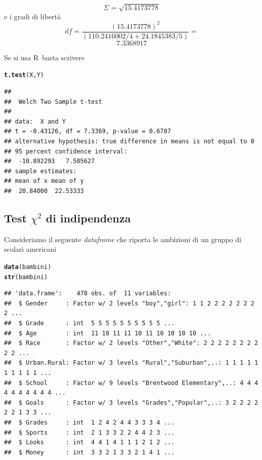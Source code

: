\documentclass[onecolumn,12pt]{book}\usepackage[]{graphicx}\usepackage[]{color}
\makeatletter
\newcommand{\hlstd}[1]{\textcolor[rgb]{0.345,0.345,0.345}{#1}}%
\newcommand{\hlkwd}[1]{\textcolor[rgb]{0.737,0.353,0.396}{\textbf{#1}}}%
\newenvironment{kframe}{%
 \def\at@end@of@kframe{}%
 \ifinner\ifhmode%
  \def\at@end@of@kframe{\end{minipage}}%
  \begin{minipage}{\columnwidth}%
 \fi\fi%
 \def\FrameCommand##1{\hskip\@totalleftmargin \hskip-\fboxsep
 \colorbox{shadecolor}{##1}\hskip-\fboxsep
     \hskip-\linewidth \hskip-\@totalleftmargin \hskip\columnwidth}%
 \MakeFramed {\advance\hsize-\width
   \@totalleftmargin\z@ \linewidth\hsize
   \@setminipage}}%
 {\par\unskip\endMakeFramed%
 \at@end@of@kframe}
\newenvironment{knitrout}{}{} %
\newcommand{\rpr}{\textsf{R}~}
\makeatother
\begin{document}
\[ \Sigma= \sqrt{15.4173778}\]
e i gradi di libertà  
\[ df =\dfrac
{  (15.4173778)^2}
{
(110.2416002/4+
24.1845383/5)
}= \]
\[
  7.3368917
\]

Se si usa  \rpr basta scrivere

\begin{knitrout}
\color{fgcolor}\begin{kframe}
\begin{alltt}
\hlkwd{t.test}\hlstd{(X,Y)}
\end{alltt}
\begin{verbatim}
## 
## 	Welch Two Sample t-test
## 
## data:  X and Y
## t = -0.43126, df = 7.3369, p-value = 0.6787
## alternative hypothesis: true difference in means is not equal to 0
## 95 percent confidence interval:
##  -10.892293   7.505627
## sample estimates:
## mean of x mean of y 
##  20.84000  22.53333
\end{verbatim}
\end{kframe}
\end{knitrout}

\subsection{Test $\chi^2$  di indipendenza}

Consideriamo il seguente \emph{dataframe} che riporta le ambizioni di un gruppo di scolari americani
\begin{knitrout}
\color{fgcolor}\begin{kframe}
\begin{alltt}
\hlkwd{data}\hlstd{(bambini)}
\hlkwd{str}\hlstd{(bambini)}
\end{alltt}
\begin{verbatim}
## 'data.frame':	478 obs. of  11 variables:
##  $ Gender     : Factor w/ 2 levels "boy","girl": 1 1 2 2 2 2 2 2 2 2 ...
##  $ Grade      : int  5 5 5 5 5 5 5 5 5 5 ...
##  $ Age        : int  11 10 11 11 10 11 10 10 10 10 ...
##  $ Race       : Factor w/ 2 levels "Other","White": 2 2 2 2 2 2 2 2 2 2 ...
##  $ Urban.Rural: Factor w/ 3 levels "Rural","Suburban",..: 1 1 1 1 1 1 1 1 1 1 ...
##  $ School     : Factor w/ 9 levels "Brentwood Elementary",..: 4 4 4 4 4 4 4 4 4 4 ...
##  $ Goals      : Factor w/ 3 levels "Grades","Popular",..: 3 2 2 2 2 2 2 1 3 3 ...
##  $ Grades     : int  1 2 4 2 4 4 3 3 3 4 ...
##  $ Sports     : int  2 1 3 3 2 2 4 4 2 3 ...
##  $ Looks      : int  4 4 1 4 1 1 1 2 1 2 ...
##  $ Money      : int  3 3 2 1 3 3 2 1 4 1 ...
\end{verbatim}
\end{kframe}
\end{knitrout}
\end{document}
